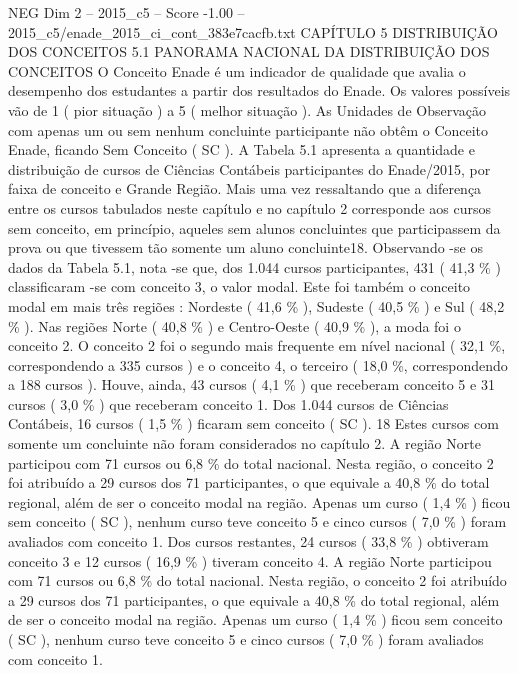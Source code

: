 \begin{textsample}{NEG Dim 2 – 2015\_c5 – Score -1.00 – 2015\_c5/enade\_2015\_ci\_cont\_383e7cacfb.txt}  \label{ex:f2_neg_155}
CAPÍTULO 5 DISTRIBUIÇÃO DOS CONCEITOS 5.1 PANORAMA NACIONAL DA DISTRIBUIÇÃO DOS CONCEITOS O Conceito Enade é um indicador de qualidade que avalia o desempenho dos estudantes a partir dos resultados do Enade.
Os valores possíveis vão de 1 ( pior situação ) a 5 ( melhor situação ).
As Unidades de Observação com apenas um ou sem nenhum concluinte participante não obtêm o Conceito Enade, ficando Sem Conceito ( SC ).
A Tabela 5.1 apresenta a quantidade e distribuição de cursos de Ciências Contábeis participantes do Enade/2015, por faixa de conceito e Grande Região.
Mais uma vez ressaltando que a diferença entre os cursos tabulados neste capítulo e no capítulo 2 corresponde aos cursos sem conceito, em princípio, aqueles sem alunos concluintes que participassem da prova ou que tivessem tão somente um aluno concluinte18.
Observando -se os dados da Tabela 5.1, nota -se que, dos 1.044 cursos participantes, 431 ( 41,3 \% ) classificaram -se com conceito 3, o valor modal.
Este foi também o conceito modal em mais três regiões : Nordeste ( 41,6 \% ), Sudeste ( 40,5 \% ) e Sul ( 48,2 \% ).
Nas regiões Norte ( 40,8 \% ) e Centro-Oeste ( 40,9 \% ), a moda foi o conceito 2.
O conceito 2 foi o segundo mais frequente em nível nacional ( 32,1 \%, correspondendo a 335 cursos ) e o conceito 4, o terceiro ( 18,0 \%, correspondendo a 188 cursos ).
Houve, ainda, 43 cursos ( 4,1 \% ) que receberam conceito 5 e 31 cursos ( 3,0 \% ) que receberam conceito 1.
Dos 1.044 cursos de Ciências Contábeis, 16 cursos ( 1,5 \% ) ficaram sem conceito ( SC ). 18 Estes cursos com somente um concluinte não foram considerados no capítulo 2.
A região Norte participou com 71 cursos ou 6,8 \% do total nacional.
Nesta região, o conceito 2 foi atribuído a 29 cursos dos 71 participantes, o que equivale a 40,8 \% do total regional, além de ser o conceito modal na região.
Apenas um curso ( 1,4 \% ) ficou sem conceito ( SC ), nenhum curso teve conceito 5 e cinco cursos ( 7,0 \% ) foram avaliados com conceito 1.
Dos cursos restantes, 24 cursos ( 33,8 \% ) obtiveram conceito 3 e 12 cursos ( 16,9 \% ) tiveram conceito 4.
A região Norte participou com 71 cursos ou 6,8 \% do total nacional.
Nesta região, o conceito 2 foi atribuído a 29 cursos dos 71 participantes, o que equivale a 40,8 \% do total regional, além de ser o conceito modal na região.
Apenas um curso ( 1,4 \% ) ficou sem conceito ( SC ), nenhum curso teve conceito 5 e cinco cursos ( 7,0 \% ) foram avaliados com conceito 1.

\end{textsample}
